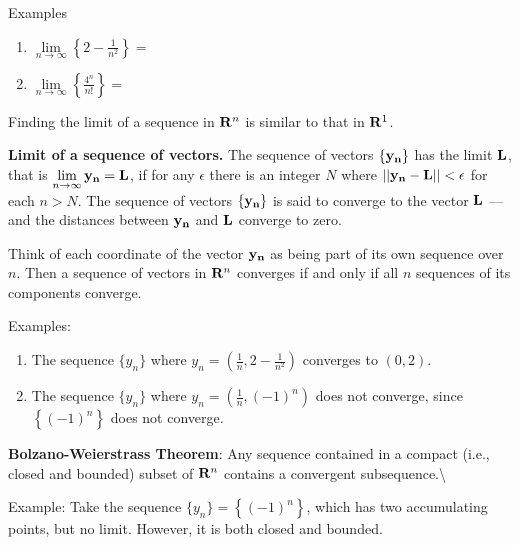 \documentclass[]{book}
\theoremstyle{definition}
\theoremstyle{definition}
\theoremstyle{definition}
\theoremstyle{remark}
\begin{document}
Examples

\begin{enumerate}
        \item $\lim\limits_{n \to \infty} \left\{ 2-\frac{1}{n^2} 
        \right\} = $
        \item $\lim\limits_{n \to \infty} \left\{ \frac{4^n}{n!} \right\} 
        = $
\end{enumerate}

Finding the limit of a sequence in \({\bf R}^n\) is similar to that in
\({\bf R}^1\).

\textbf{Limit of a sequence of vectors.} The sequence of vectors
\(\bf \{ y_n \}\) has the limit \(\bf L\), that is
\(\lim\limits_{n\to\infty} {\bf y_n}={\bf L}\), if for any \(\epsilon\)
there is an integer \(N\) where \(\bf ||y_n-L||<\epsilon\) for each
\(n>N\). The sequence of vectors \(\bf \{ y_n\}\) is said to converge to
the vector \(\bf L\) --- and the distances between \(\bf y_n\) and
\(\bf L\) converge to zero.

Think of each coordinate of the vector \(\bf y_n\) as being part of its
own sequence over \(n\). Then a sequence of vectors in \({\bf R}^n\)
converges if and only if all \(n\) sequences of its components converge.

Examples:

\begin{enumerate}
        \item The sequence $\{ y_n \}$ where $y_n=\left( \frac{1}{n}, 2-\frac{1}{n^2} \right)$ converges to $(0,2)$.
        \item The sequence $\{ y_n \}$ where $y_n=\left( \frac{1}{n}, (-1)^n \right)$ does not converge, since $\left\{ (-1)^n \right\}$ does not converge.
\end{enumerate}

\textbf{Bolzano-Weierstrass Theorem}: Any sequence contained in a
compact (i.e., closed and bounded) subset of \({\bf R}^n\) contains a
convergent subsequence.\textbackslash{}
\parbox[t]{4in}{Example: Take the sequence $\{ y_n \} =\left\{ (-1)^n \right\}$, which has two accumulating points, but no limit.  However, it is both closed and bounded.}\\

\end{document}

